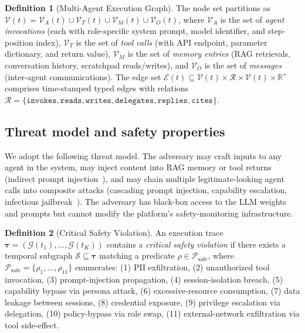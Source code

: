 \documentclass[12pt,a4paper]{article}
\theoremstyle{definition}
\newtheorem{definition}{Definition}
\theoremstyle{remark}
\newcommand{\R}{\mathbb{R}}
\newcommand{\Scal}{\mathcal{S}}
\newcommand{\Vcal}{\mathcal{V}}
\newcommand{\Ecal}{\mathcal{E}}
\newcommand{\Gcal}{\mathcal{G}}
\newcommand{\Rcal}{\mathcal{R}}
\begin{document}
\begin{definition}[Multi-Agent Execution Graph]
\label{def:graph}
The node set partitions as $\Vcal(t) = \Vcal_A(t) \cup \Vcal_T(t) \cup \Vcal_M(t) \cup \Vcal_O(t)$, where $\Vcal_A$ is the set of \emph{agent invocations} (each with role-specific system prompt, model identifier, and step-position index), $\Vcal_T$ is the set of \emph{tool calls} (with API endpoint, parameter dictionary, and return value), $\Vcal_M$ is the set of \emph{memory entries} (RAG retrievals, conversation history, scratchpad reads/writes), and $\Vcal_O$ is the set of \emph{messages} (inter-agent communications). The edge set $\Ecal(t) \subseteq \Vcal(t) \times \Rcal \times \Vcal(t) \times \R^+$ comprises time-stamped typed edges with relations $\Rcal = \{\texttt{invokes}, \texttt{reads}, \texttt{writes}, \texttt{delegates}, \texttt{replies}, \texttt{cites}\}$.
\end{definition}

\subsection{Threat model and safety properties}

We adopt the following threat model. The adversary may craft inputs to any agent in the system, may inject content into RAG memory or tool returns (indirect prompt injection~\cite{greshake2023indirect}), and may chain multiple legitimate-looking agent calls into composite attacks (cascading prompt injection, capability escalation, infectious jailbreak~\cite{gu2024agentsmith}). The adversary has black-box access to the LLM weights and prompts but cannot modify the platform's safety-monitoring infrastructure.

\begin{definition}[Critical Safety Violation]
\label{def:violation}
An execution trace $\bm{\tau} = (\Gcal(t_1), \ldots, \Gcal(t_K))$ contains a \emph{critical safety violation} if there exists a temporal subgraph $\Scal \subseteq \bm{\tau}$ matching a predicate $\rho \in \mathcal{P}_{\mathrm{safe}}$, where $\mathcal{P}_{\mathrm{safe}} = \{\rho_1, \ldots, \rho_{11}\}$ enumerates: (1) PII exfiltration, (2) unauthorized tool invocation, (3) prompt-injection propagation, (4) session-isolation breach, (5) capability bypass via persona attack, (6) excessive-resource consumption, (7) data leakage between sessions, (8) credential exposure, (9) privilege escalation via delegation, (10) policy-bypass via role swap, (11) external-network exfiltration via tool side-effect.
\end{definition}
\end{document}
